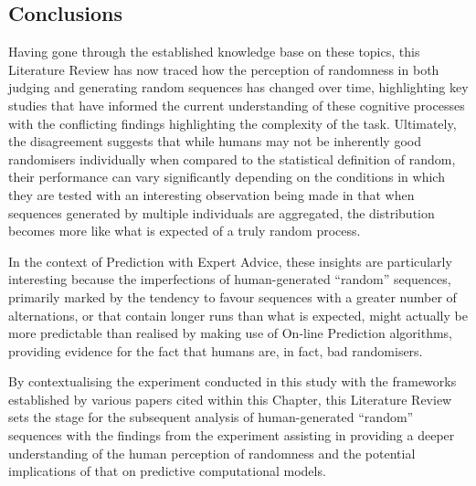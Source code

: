 
\newpage



\subsection{Conclusions}
Having gone through the established knowledge base on these topics, this Literature Review has now traced how the perception of randomness in both judging and generating random sequences has changed over time, highlighting key studies that have informed the current understanding of these cognitive processes with the conflicting findings highlighting the complexity of the task. Ultimately, the disagreement suggests that while humans may not be inherently good randomisers individually when compared to the statistical definition of random, their performance can vary significantly depending on the conditions in which they are tested with an interesting observation being made in that when sequences generated by multiple individuals are aggregated, the distribution becomes more like what is expected of a truly random process.

In the context of Prediction with Expert Advice, these insights are particularly interesting because the imperfections of human-generated ``random'' sequences, primarily marked by the tendency to favour sequences with a greater number of alternations, or that contain longer runs than what is expected, might actually be more predictable than realised by making use of On-line Prediction algorithms, providing evidence for the fact that humans are, in fact, bad randomisers.

By contextualising the experiment conducted in this study with the frameworks established by various papers cited within this Chapter, this Literature Review sets the stage for the subsequent analysis of human-generated ``random'' sequences with the findings from the experiment assisting in providing a deeper understanding of the human perception of randomness and the potential implications of that on predictive computational models.